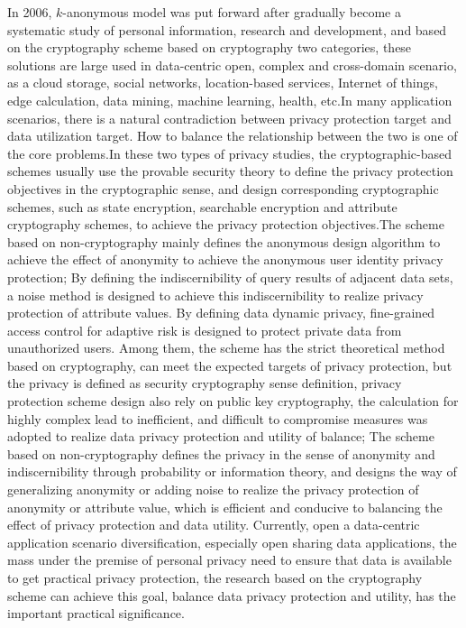 \documentclass[pdftex,notypeinfo,twoside,openany,UTF8,fntef]{CASthesis}
\theoremstyle{THrm}{
	\newtheorem{question}{Question}[section]
	\newtheorem{property}{性质}[section]
	\newtheorem{assumption}{假设}[section]
	\newtheorem{claim}[lemma]{断言}
	
}
\begin{document}
In 2006,  $k$-anonymous model was put forward after gradually become a systematic study of personal information, research and development, and based on the cryptography scheme based on cryptography two categories, these solutions are large used in data-centric open, complex and cross-domain scenario, as a cloud storage, social networks, location-based services, Internet of things, edge calculation, data mining, machine learning, health, etc.In many application scenarios, there is a natural contradiction between privacy protection target and data utilization target. How to balance the relationship between the two is one of the core problems.In these two types of privacy studies, the cryptographic-based schemes usually use the provable security theory to define the privacy protection objectives in the cryptographic sense, and design corresponding cryptographic schemes, such as state encryption, searchable encryption and attribute cryptography schemes, to achieve the privacy protection objectives.The scheme based on non-cryptography mainly defines the anonymous design algorithm to achieve the effect of anonymity to achieve the anonymous user identity privacy protection; By defining the indiscernibility of query results of adjacent data sets, a noise method is designed to achieve this indiscernibility to realize privacy protection of attribute values. By defining data dynamic privacy, fine-grained access control for adaptive risk is designed to protect private data from unauthorized users. Among them, the scheme has the strict theoretical method based on cryptography, can meet the expected targets of privacy protection, but the privacy is defined as security cryptography sense definition, privacy protection scheme design also rely on public key cryptography, the calculation for highly complex lead to inefficient, and difficult to compromise measures was adopted to realize data privacy protection and utility of balance; The scheme based on non-cryptography defines the privacy in the sense of anonymity and indiscernibility through probability or information theory, and designs the way of generalizing anonymity or adding noise to realize the privacy protection of anonymity or attribute value, which is efficient and conducive to balancing the effect of privacy protection and data utility. Currently, open a data-centric application scenario diversification, especially open sharing data applications, the mass under the premise of personal privacy need to ensure that data is available to get practical privacy protection, the research based on the cryptography scheme can achieve this goal, balance data privacy protection and utility, has the important practical significance.
\end{document}

